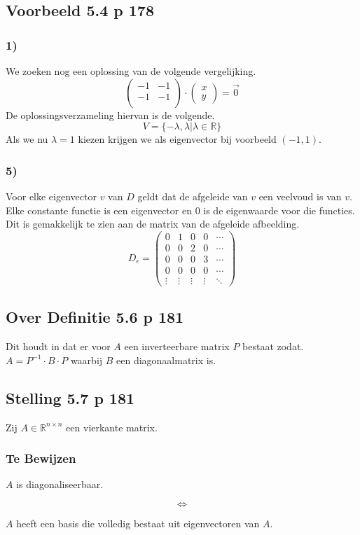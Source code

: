\documentclass[lineaire_algebra_oplossingen.tex]{subfiles}
\begin{document}
\subsection{Voorbeeld 5.4 p 178}
\subsubsection*{1)}
We zoeken nog een oplossing van de volgende vergelijking.
\[
\begin{pmatrix}
-1 & -1\\
-1 & -1\\
\end{pmatrix}
\cdot
\begin{pmatrix}
x\\y
\end{pmatrix}
=
\vec{0}
\]
De oplossingsverzameling hiervan is de volgende.
\[
V = \{-\lambda,\lambda|\lambda\in\mathbb{R}\}
\]
Als we nu $\lambda = 1$ kiezen krijgen we als eigenvector bij voorbeeld $(-1,1)$.

\subsubsection*{5)}
Voor elke eigenvector $v$ van $D$ geldt dat de afgeleide van $v$ een veelvoud is van $v$. Elke constante functie is een eigenvector en $0$ is de eigenwaarde voor die functies. Dit is gemakkelijk te zien aan de matrix van de afgeleide afbeelding.
\[
D_{\epsilon} = 
\begin{pmatrix}
0 & 1 & 0 & 0 & \cdots\\
0 & 0 & 2 & 0 & \cdots\\
0 & 0 & 0 & 3 & \cdots\\
0 & 0 & 0 & 0 & \cdots\\
\vdots &\vdots & \vdots & \vdots & \ddots
\end{pmatrix}
\]

\subsection{Over Definitie 5.6 p 181}
Dit houdt in dat er voor $A$ een inverteerbare matrix $P$ bestaat zodat. $A = P^{-1}\cdot B\cdot P$ waarbij $B$ een diagonaalmatrix is.

\subsection{Stelling 5.7 p 181}
Zij $A \in \mathbb{R}^{n\times n}$ een vierkante matrix.
\subsubsection*{Te Bewijzen}
\begin{center}
$A$ is diagonaliseerbaar.
\end{center}
\[\Leftrightarrow\]
\begin{center}
$A$ heeft een basis die volledig bestaat uit eigenvectoren van $A$.
\end{center}
\end{document}
